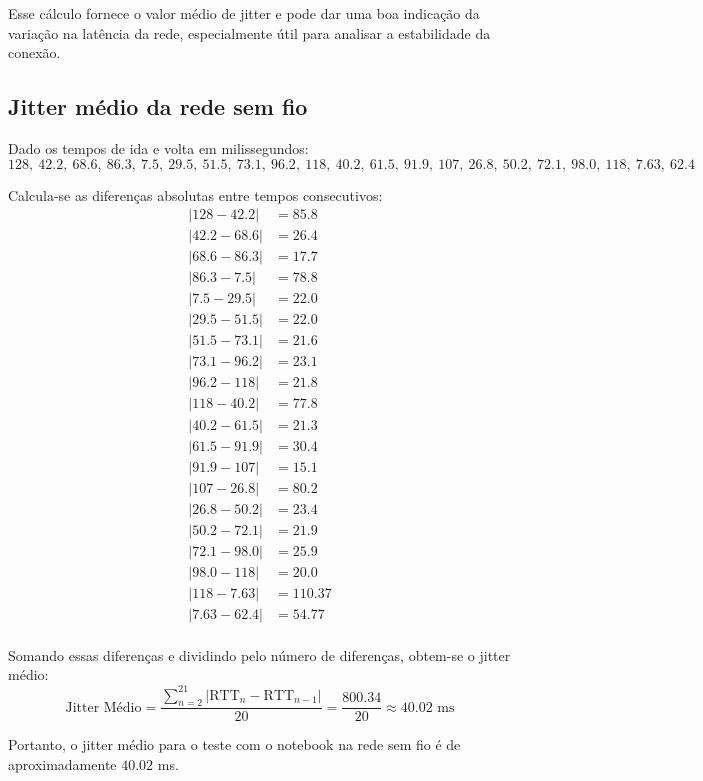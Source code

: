 \documentclass[a4paper,12pt]{article}
\begin{document}
Esse cálculo fornece o valor médio de jitter e pode dar uma boa indicação da variação na latência da rede, especialmente útil para analisar a estabilidade da conexão.

\subsection*{Jitter médio da rede sem fio}

Dado os tempos de ida e volta em milissegundos:
\[
128, \ 42.2, \ 68.6, \ 86.3, \ 7.5, \ 29.5, \ 51.5, \ 73.1, \ 96.2, \ 118, \ 40.2, \ 61.5, \ 91.9, \ 107, \ 26.8, \ 50.2, \ 72.1, \ 98.0, \ 118, \ 7.63, \ 62.4
\]

Calcula-se as diferenças absolutas entre tempos consecutivos:
\[
\begin{align*}
|128 - 42.2| &= 85.8 \\
|42.2 - 68.6| &= 26.4 \\
|68.6 - 86.3| &= 17.7 \\
|86.3 - 7.5| &= 78.8 \\
|7.5 - 29.5| &= 22.0 \\
|29.5 - 51.5| &= 22.0 \\
|51.5 - 73.1| &= 21.6 \\
|73.1 - 96.2| &= 23.1 \\
|96.2 - 118| &= 21.8 \\
|118 - 40.2| &= 77.8 \\
|40.2 - 61.5| &= 21.3 \\
|61.5 - 91.9| &= 30.4 \\
|91.9 - 107| &= 15.1 \\
|107 - 26.8| &= 80.2 \\
|26.8 - 50.2| &= 23.4 \\
|50.2 - 72.1| &= 21.9 \\
|72.1 - 98.0| &= 25.9 \\
|98.0 - 118| &= 20.0 \\
|118 - 7.63| &= 110.37 \\
|7.63 - 62.4| &= 54.77 \\
\end{align*}
\]

Somando essas diferenças e dividindo pelo número de diferenças, obtem-se o jitter médio:
\[
\text{Jitter Médio} = \frac{\sum_{n=2}^{21} |\text{RTT}_n - \text{RTT}_{n-1}|}{20} = \frac{800.34}{20} \approx 40.02 \text{ ms}
\]

Portanto, o jitter médio para o teste com o notebook na rede sem fio é de aproximadamente \( 40.02 \) ms.
\end{document}
